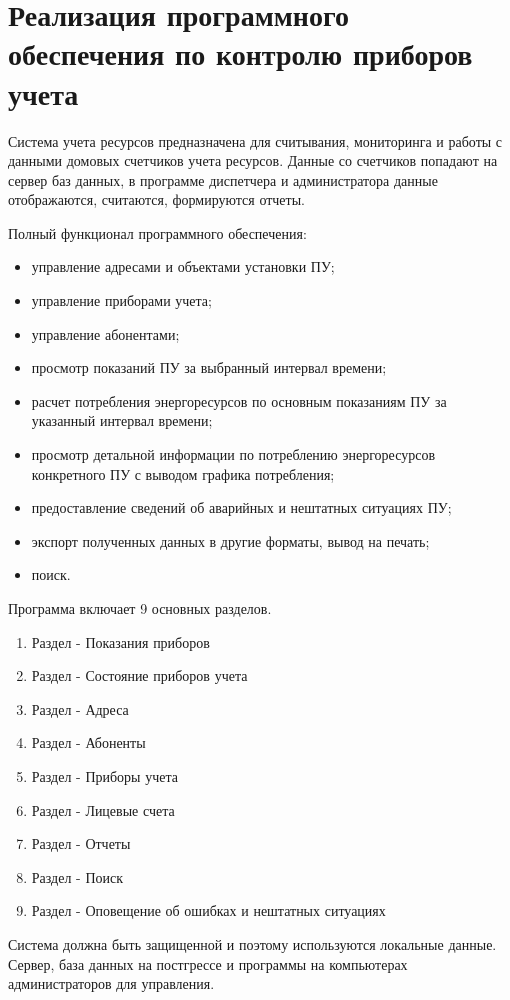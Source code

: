 
\section{Реализация программного обеспечения по контролю приборов учета}

Система учета ресурсов предназначена для считывания, мониторинга и работы с данными домовых счетчиков учета ресурсов. Данные со счетчиков попадают на сервер баз данных, в программе диспетчера и администратора данные отображаются, считаются, формируются отчеты.

Полный функционал программного обеспечения:
\begin{itemize}
\item управление адресами и объектами установки ПУ;
\item управление приборами учета;
\item управление абонентами; 
\item просмотр показаний ПУ за выбранный интервал времени; 
\item расчет потребления энергоресурсов по основным показаниям ПУ за указанный интервал времени; 
\item просмотр детальной информации по потреблению энергоресурсов конкретного ПУ с выводом графика потребления; 
\item предоставление сведений об аварийных и нештатных ситуациях ПУ; 
\item экспорт полученных данных в другие форматы, вывод на печать;
\item поиск.
\end{itemize}

Программа включает 9 основных разделов.
\begin{enumerate}
	\item Раздел - Показания приборов
	\item Раздел - Состояние приборов учета
	\item Раздел - Адреса
	\item Раздел - Абоненты
	\item Раздел - Приборы учета
	\item Раздел - Лицевые счета
	\item Раздел - Отчеты
	\item Раздел - Поиск
	\item Раздел - Оповещение об ошибках и нештатных ситуациях
\end{enumerate}

Система должна быть защищенной и поэтому используются локальные данные. Сервер, база данных на постгрессе и программы на компьютерах администраторов для управления. 

